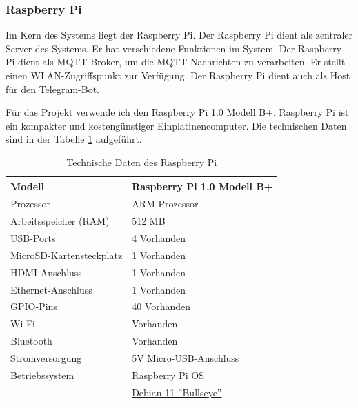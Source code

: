 \documentclass[12pt, letterpaper]{article}
\begin{document}
\subsubsection{Raspberry Pi}
\par Im Kern des Systems liegt der Raspberry Pi. Der Raspberry Pi dient als zentraler Server des Systems. Er hat verschiedene Funktionen im System. Der Raspberry Pi dient als MQTT-Broker, um die MQTT-Nachrichten zu verarbeiten. Er stellt einen WLAN-Zugriffspunkt zur Verfügung. Der Raspberry Pi dient auch als Host für den Telegram-Bot. 
\par Für das Projekt verwende ich den Raspberry Pi 1.0 Modell B+. Raspberry Pi ist ein kompakter und kostengünstiger Einplatinencomputer. Die technischen Daten sind in der Tabelle \ref{tbl:raspberry_tech} aufgeführt.
\begin{table}[h!]
  \centering
  \renewcommand{\arraystretch}{1.5}
  \begin{tabular}{|l|l|}
  \hline
  Modell                               & Raspberry Pi 1.0 Modell B+               \\ \hline
  Prozessor                            & ARM-Prozessor                            \\ \hline
  Arbeitsspeicher (RAM)                & 512 MB                                   \\ \hline
  USB-Ports                            & 4 Vorhanden                                \\ \hline
  MicroSD-Kartensteckplatz             & 1 Vorhanden                                \\ \hline
  HDMI-Anschluss                       & 1 Vorhanden                                \\ \hline
  Ethernet-Anschluss                   & 1 Vorhanden                                \\ \hline
  GPIO-Pins                            & 40 Vorhanden                                \\ \hline
  Wi-Fi                                & Vorhanden                                \\ \hline
  Bluetooth                            & Vorhanden                                \\ \hline
  Stromversorgung                      & 5V Micro-USB-Anschluss                      \\ \hline
  Betriebssystem                       & Raspberry Pi OS \\ & \underline{Debian 11 ''Bullseye''}              \\ \hline
  \end{tabular}
  \caption{Technische Daten des Raspberry Pi}
  \label{tbl:raspberry_tech}
  \end{table}
\end{document}
